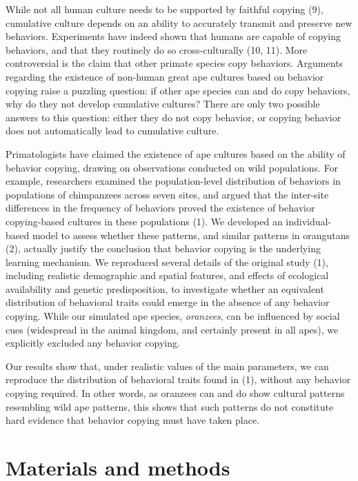 \documentclass[9pt,twocolumn,twoside,]{pnas-new}
\begin{document}
While not all human culture needs to be supported by faithful copying
(9), cumulative culture depends on an ability to accurately transmit and
preserve new behaviors. Experiments have indeed shown that humans are
capable of copying behaviors, and that they routinely do so
cross-culturally (10, 11). More controversial is the claim that other
primate species copy behaviors. Arguments regarding the existence of
non-human great ape cultures based on behavior copying raise a puzzling
question: if other ape species can and do copy behaviors, why do they
not develop cumulative cultures? There are only two possible answers to
this question: either they do not copy behavior, or copying behavior
does not automatically lead to cumulative culture.

Primatologists have claimed the existence of ape cultures based on the
ability of behavior copying, drawing on observations conducted on wild
populations. For example, researchers examined the population-level
distribution of behaviors in populations of chimpanzees across seven
sites, and argued that the inter-site differences in the frequency of
behaviors proved the existence of behavior copying-based cultures in
these populations (1). We developed an individual-based model to assess
whether these patterns, and similar patterns in orangutans (2), actually
justify the conclusion that behavior copying is the underlying learning
mechanism. We reproduced several details of the original study (1),
including realistic demographic and spatial features, and effects of
ecological availability and genetic predisposition, to investigate
whether an equivalent distribution of behavioral traits could emerge in
the absence of any behavior copying. While our simulated ape species,
\emph{oranzees}, can be influenced by social cues (widespread in the
animal kingdom, and certainly present in all apes), we explicitly
excluded any behavior copying.

Our results show that, under realistic values of the main parameters, we
can reproduce the distribution of behavioral traits found in (1),
without any behavior copying required. In other words, as oranzees can
and do show cultural patterns resembling wild ape patterns, this shows
that such patterns do not constitute hard evidence that behavior copying
must have taken place.

\section*{Materials and methods}\label{materials-and-methods}
\end{document}
